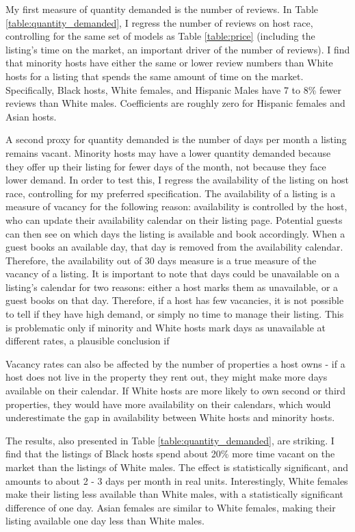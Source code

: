 My first measure of quantity demanded is the number of reviews. In Table \ref{table:quantity_demanded}, I regress the number of reviews on host race, controlling for the same set of models as Table \ref{table:price} (including the listing's time on the market, an important driver of the number of reviews). I find that minority hosts have either the same or lower review numbers than White hosts for a listing that spends the same amount of time on the market. Specifically, Black hosts, White females, and Hispanic Males have 7 to 8\% fewer reviews than White males. Coefficients are roughly zero for Hispanic females and Asian hosts. 

A second proxy for quantity demanded is the number of days per month a listing remains vacant. Minority hosts may have a lower quantity demanded because they offer up their listing for fewer days of the month, not because they face lower demand. In order to test this, I regress the availability of the listing on host race, controlling for my preferred specification. The availability of a listing is a measure of vacancy for the following reason: availability is controlled by the host, who can update their availability calendar on their listing page. Potential guests can then see on which days the listing is available and book accordingly. When a guest books an available day, that day is removed from the availability calendar. Therefore, the availability out of 30 days measure is a true measure of the vacancy of a listing. It is  important to note that days could be unavailable on a listing's calendar for two reasons: either a host marks them as unavailable, or a guest books on that day. Therefore, if a host has few vacancies, it is not possible to tell if they have high demand, or simply no time to manage their listing. This is problematic only if minority and White hosts mark days as unavailable at different rates, a plausible conclusion if 

Vacancy rates can also be affected by the number of properties a host owns - if a host does not live in the property they rent out, they might make more days available on their calendar. If White hosts are more likely to own second or third properties, they would have more availability on their calendars, which would underestimate the gap in availability between White hosts and minority hosts.  

The results, also presented in Table \ref{table:quantity_demanded}, are striking. I find that the listings of Black hosts spend about 20\% more time vacant on the market than the listings of White males. The effect is statistically significant, and amounts to about 2 - 3 days per month in real units. Interestingly, White females make their listing less available than White males, with a statistically significant difference of one day. Asian females are similar to White females, making their listing available one day less than White males. 

